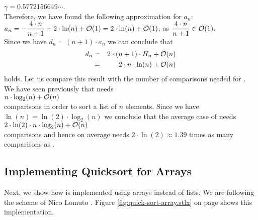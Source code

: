 \hspace*{1.3cm}
$\gamma = 0.5772156649 \cdots$.
\\[0.2cm]
Therefore, we have found the following approximation for $a_n$:
\\[0.2cm]
\hspace*{1.3cm}
$\displaystyle a_n = - \frac{4 \cdot n}{n+1}  + 2 \cdot \ln(n) + \mathcal{O}(1) =  2 \cdot \ln(n) + \mathcal{O}(1)$,
\quad as \quad $\displaystyle \frac{4 \cdot n}{n+1} \in \mathcal{O}(1)$.
\\[0.2cm]
Since we have $d_n = (n+1) \cdot a_{n}$ we can conclude that
\begin{eqnarray*}  
 d_n & = &  2 \cdot(n+1) \cdot H_n + \mathcal{O}(n) \\
     & = & 2 \cdot n \cdot \ln(n) + \mathcal{O}(n)
\end{eqnarray*}
holds.  Let us compare this result with the number of comparisons needed for .
We have seen previously that  needs
\\[0.2cm]
\hspace*{1.3cm} $n \cdot \log_2(n) + \mathcal{O}(n)$ \\[0.2cm]
comparisons in order to sort a list of $n$ elements.  Since we have $\ln(n) = \ln(2) \cdot \log_2(n)$
we conclude that the average case of  needs
 \\[0.2cm]
\hspace*{1.3cm} $2 \cdot \ln(2) \cdot n \cdot \log_2(n) + \mathcal{O}(n)$ \\[0.2cm]
comparisons and hence on average  needs  $2 \cdot \ln(2) \approx 1.39$ times as many comparisons as
.  


\subsection{Implementing Quicksort for Arrays}
Next, we show how   is implemented using arrays instead of lists.  We are following the scheme
of Nico Lomuto \cite{cormen:09}.
Figure \ref{fig:quick-sort-array.stlx} on page \pageref{fig:quick-sort-array.stlx} shows this implementation. 

